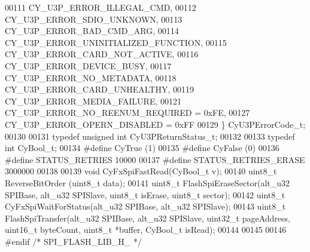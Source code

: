 \begin{DoxyCode}
00111     CY_U3P_ERROR_ILLEGAL_CMD,                   
00112     CY_U3P_ERROR_SDIO_UNKNOWN,                  
00113     CY_U3P_ERROR_BAD_CMD_ARG,                   
00114     CY_U3P_ERROR_UNINITIALIZED_FUNCTION,        
00115     CY_U3P_ERROR_CARD_NOT_ACTIVE,               
00116     CY_U3P_ERROR_DEVICE_BUSY,                   
00117     CY_U3P_ERROR_NO_METADATA,           
00118     CY_U3P_ERROR_CARD_UNHEALTHY,        
00119     CY_U3P_ERROR_MEDIA_FAILURE,         
00121     CY_U3P_ERROR_NO_REENUM_REQUIRED = 0xFE, 
00127     CY_U3P_ERROR_OPERN_DISABLED = 0xFF      
00129 \} CyU3PErrorCode_t;
00130 
00131 \textcolor{keyword}{typedef} \textcolor{keywordtype}{unsigned} \textcolor{keywordtype}{int} CyU3PReturnStatus_t;
00132 
00133 \textcolor{keyword}{typedef} \textcolor{keywordtype}{int} CyBool_t;                           
00134 \textcolor{preprocessor}{#define CyTrue                  (1)             }
00135 \textcolor{preprocessor}{#define CyFalse                 (0)             }
00136 \textcolor{preprocessor}{#define STATUS\_RETRIES          10000}
00137 \textcolor{preprocessor}{#define STATUS\_RETRIES\_ERASE    3000000}
00138 
00139 \textcolor{keywordtype}{void} CyFxSpiFastRead(CyBool_t v);
00140 uint8\_t ReverseBitOrder (uint8\_t data);
00141 uint8\_t FlashSpiEraseSector(alt_u32 SPIBase, alt_u32 SPISlave, uint8\_t isErase, uint8\_t sector);
00142 uint8\_t CyFxSpiWaitForStatus(alt_u32 SPIBase, alt_u32 SPISlave);
00143 uint8\_t FlashSpiTransfer(alt_u32 SPIBase, alt_u32 SPISlave, uint32\_t pageAddress, uint16\_t byteCount, 
      uint8\_t *buffer, CyBool_t isRead);
00144 
00145 
00146 \textcolor{preprocessor}{#endif }\textcolor{comment}{/* SPI\_FLASH\_LIB\_H\_ */}\textcolor{preprocessor}{}
\end{DoxyCode}
